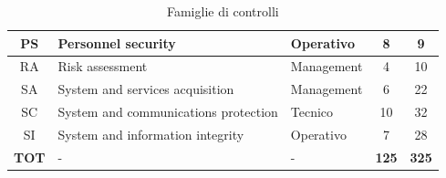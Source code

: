 \documentclass[../main.tex]{subfiles}
\begin{document}
\begin{table}[h]
\begin{tabulary}{\textwidth}{|C|L|L|C|C|}
    PS            & Personnel security                                  & Operativo       & 8                      & 9                         \\ \hline
    RA            & Risk assessment                                     & Management      & 4                      & 10                        \\ \hline
    SA            & System and services acquisition                     & Management      & 6                      & 22                        \\ \hline
    SC            & System and communications protection                & Tecnico         & 10                     & 32                        \\ \hline
    SI            & System and information integrity                    & Operativo       & 7                      & 28                        \\ \hline \hline
    \textbf{TOT } & -                                                   & -               & \textbf{125}           & \textbf{325}              \\ \hline
    \end{tabulary}
    \caption{Famiglie di controlli\cite{fedrampLowSC}\cite{fedrampModSC}}\label{tab:80053fedrampfamilies}
\end{table}
\end{document}
